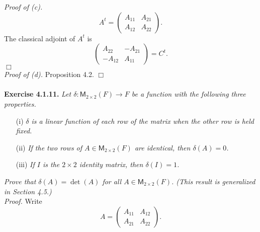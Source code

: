 \documentclass{article}
\begin{document}
\emph{Proof of (c).}
$$A^t =
\begin{pmatrix}
A_{11} & A_{21} \\
A_{12} & A_{22}
\end{pmatrix}.$$
The classical adjoint of $A^t$ is
$$
\begin{pmatrix}
A_{22} & -A_{21} \\
-A_{12} & A_{11}
\end{pmatrix} = C^t.$$
$\Box$ \\

\emph{Proof of (d).}
Proposition 4.2.
$\Box$ \\\\






\textbf{Exercise 4.1.11.}
\emph{Let $\delta: \mathsf{M}_{2 \times 2}(F) \to F$
be a function with the following three properties.}
\begin{enumerate}
\item[(i)]
\emph{$\delta$ is a linear function of each row of the matrix when the other row
is held fixed.}
\item[(ii)]
\emph{If the two rows of $A \in \mathsf{M}_{2 \times 2}(F)$ are identical,
then $\delta(A) = 0$.}
\item[(iii)]
\emph{If $I$ is the $2 \times 2$ identity matrix, then $\delta(I) = 1$.}
\end{enumerate}
\emph{Prove that $\delta(A) = \det(A)$ for all $A \in \mathsf{M}_{2 \times 2}(F)$.
(This result is generalized in Section 4.5.)} \\

\emph{Proof.}
Write
$$A =
\begin{pmatrix}
A_{11} & A_{12} \\
A_{21} & A_{22}
\end{pmatrix}.$$
\end{document}
